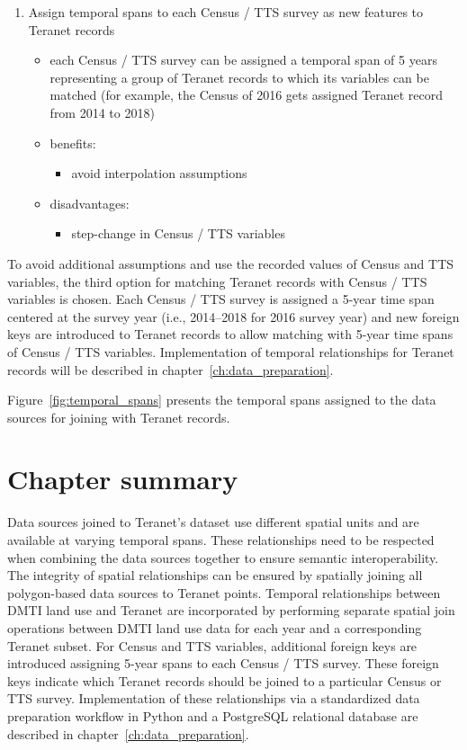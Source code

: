 \begin{enumerate}
\begin{itemize}
\begin{itemize}
        \end{itemize}
    \end{itemize}
    \item Assign temporal spans to each Census / TTS survey as new features to Teranet records
    \begin{itemize}
        \item each Census / TTS survey can be assigned a temporal span of 5 years representing a group of Teranet records to which its variables can be matched (for example, the Census of 2016 gets assigned Teranet record from 2014 to 2018)
        \item benefits:
        \begin{itemize}
            \item avoid interpolation assumptions
        \end{itemize}
        \item disadvantages:
        \begin{itemize}
            \item step-change in Census / TTS variables
        \end{itemize}
    \end{itemize}
\end{enumerate}

To avoid additional assumptions and use the recorded values of Census and TTS variables, the third option for matching Teranet records with Census / TTS variables is chosen.
Each Census / TTS survey is assigned a 5-year time span centered at the survey year (i.e., 2014--2018 for 2016 survey year) and new foreign keys are introduced to Teranet records to allow matching with 5-year time spans of Census / TTS variables.
Implementation of temporal relationships for Teranet records will be described in chapter~\ref{ch:data_preparation}.

Figure~\ref{fig:temporal_spans} presents the temporal spans assigned to the data sources for joining with Teranet records.

\section{Chapter summary} \label{sec:data_sources_summary}

Data sources joined to Teranet's dataset use different spatial units and are available at varying temporal spans.
These relationships need to be respected when combining the data sources together to ensure semantic interoperability.
The integrity of spatial relationships can be ensured by spatially joining all polygon-based data sources to Teranet points.
Temporal relationships between DMTI land use and Teranet are incorporated by performing separate spatial join operations between DMTI land use data for each year and a corresponding Teranet subset.
For Census and TTS variables, additional foreign keys are introduced assigning 5-year spans to each Census / TTS survey.
These foreign keys indicate which Teranet records should be joined to a particular Census or TTS survey.
Implementation of these relationships via a standardized data preparation workflow in Python and a PostgreSQL relational database are described in chapter~\ref{ch:data_preparation}.
